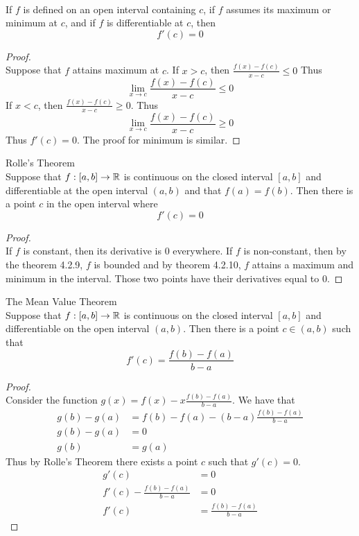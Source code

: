 \documentclass[a4paper]{article}
\begin{document}
\begin{thm}{}{}\\ If $f$ is defined on an open interval containing $c$, if $f$ assumes its maximum or minimum at $c$, and if $f$ is differentiable at $c$, then $$f'(c)=0$$ 
\begin{proof}\\ Suppose that $f$ attains maximum at $c$. If $x>c$, then $\frac{f(x)-f(c)}{x-c}\leq 0$ Thus $$\lim_{x\to c}\frac{f(x)-f(c)}{x-c}\leq 0$$ If $x<c$, then $\frac{f(x)-f(c)}{x-c}\geq 0$. Thus $$\lim_{x\to c}\frac{f(x)-f(c)}{x-c}\geq 0$$ Thus $f'(c)=0$. The proof for minimum is similar. 
\end{proof}
\end{thm}

\begin{thm}{Rolle's Theorem}{}\\ Suppose that $f:[a,b]\to\mathbb{R}$ is continuous on the closed interval $[a,b]$ and differentiable at the open interval $(a,b)$ and that $f(a)=f(b)$. Then there is a point $c$ in the open interval where $$f'(c)=0$$ 
\begin{proof}\\ If $f$ is constant, then its derivative is $0$ everywhere. If $f$ is non-constant, then by the theorem 4.2.9, $f$ is bounded and by theorem 4.2.10, $f$ attains a maximum and minimum in the interval. Those two points have their derivatives equal to $0$. 
\end{proof}
\end{thm}

\begin{thm}{The Mean Value Theorem}{}\\ Suppose that $f:[a,b]\to\mathbb{R}$ is continuous on the closed interval $[a,b]$ and differentiable on the open interval $(a,b)$. Then there is a point $c\in(a,b)$ such that $$f'(c)=\frac{f(b)-f(a)}{b-a}$$ 
\begin{proof}\\ Consider the function $g(x)=f(x)-x\frac{f(b)-f(a)}{b-a}$. We have that 
\begin{align*}
g(b)-g(a)&=f(b)-f(a)-(b-a)\frac{f(b)-f(a)}{b-a}\\
g(b)-g(a)&=0\\
g(b)&=g(a)
\end{align*} Thus by Rolle's Theorem there exists a point $c$ such that $g'(c)=0$. 
\begin{align*}
g'(c)&=0\\
f'(c)-\frac{f(b)-f(a)}{b-a}&=0\\
f'(c)&=\frac{f(b)-f(a)}{b-a}
\end{align*}
\end{proof}
\end{thm}
\end{document}
